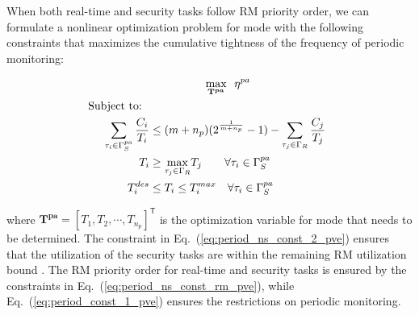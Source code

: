\documentclass[../rt_server_main.tex]{subfiles}
\begin{document}
When both real-time and security tasks follow RM priority order, we can formulate a nonlinear optimization problem for \pve mode with the following constraints that maximizes the cumulative tightness of the frequency of periodic monitoring:

\begin{myoptimizationproblem} \label{opt:period_adapt_ns_pve}
\vspace*{-2.0em}
\begin{subequations}
\begin{align}
 & \hspace*{5em} \underset{\mathbf{T}^{\boldsymbol {pa}}}{\operatorname{max}}~~\eta^{pa}  \nonumber \\
\hspace*{-0.45em}\text{Subject to:}~~ \nonumber \\
\sum_{\tau_i \in \Gamma_S^{pa}}\frac{C_i}{T_i} &\leq (m+n_p)(2^{\frac{1}{m+n_p}} - 1) - \sum_{\tau_j \in \Gamma_R}\frac{C_j}{T_j} \label{eq:period_ns_const_2_pve}\\
T_i &\geq \underset{\tau_j \in \Gamma_{R} }{\operatorname{max}} T_j \quad \quad \forall \tau_i \in \Gamma_S^{pa} \label{eq:period_ns_const_rm_pve} \\
T_i^{des} &\leq T_i \leq T_i^{max}  \quad \forall \tau_i \in \Gamma_S^{pa} \label{eq:period_const_1_pve}
\end{align}
\end{subequations}
\end{myoptimizationproblem}  
\hspace{-1.9em}
where $\mathbf{T}^{\boldsymbol{pa}} = [ T_1, T_2, \cdots, T_{n_p} ]^{\mathsf{T}}$ is the optimization variable for \pve mode that needs to be determined. The constraint in Eq.~(\ref{eq:period_ns_const_2_pve}) ensures that the utilization %
of the security tasks are within the remaining RM utilization bound \cite{Liu_n_Layland1973}. The RM priority order for real-time and security tasks is ensured by the constraints in Eq.~(\ref{eq:period_ns_const_rm_pve}), while  Eq.~(\ref{eq:period_const_1_pve}) ensures the restrictions on periodic monitoring. %
\end{document}
